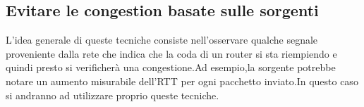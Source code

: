 \subsection{Evitare le congestion basate sulle sorgenti}
L'idea generale di queste tecniche consiste nell'osservare qualche segnale proveniente dalla rete che indica che la coda di un router si sta riempiendo e quindi presto si verificherà una congestione.Ad esempio,la sorgente potrebbe notare un aumento misurabile dell'RTT per ogni pacchetto inviato.In questo caso si andranno ad utilizzare proprio queste tecniche.\\
